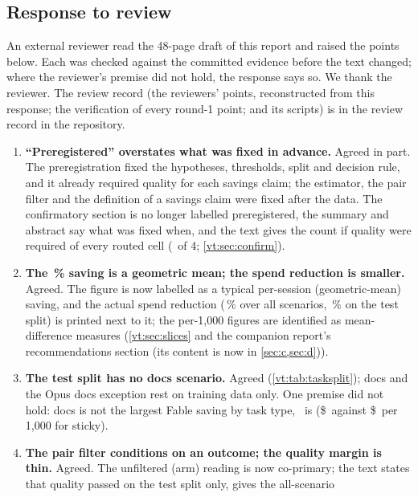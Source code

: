 \subsection{Response to review}\label{vt:app:review}

An external reviewer read the 48-page draft of this report and raised the points below. Each was checked against
the committed evidence before the text changed; where the reviewer's premise did not hold, the response says so.
We thank the reviewer. The review record (the reviewers' points, reconstructed from this response; the verification of
every round-1 point; and its scripts) is in the review record in the repository.

\begin{enumerate}[leftmargin=1.6em]
  \item \textbf{``Preregistered'' overstates what was fixed in advance.} Agreed in part. The preregistration fixed the
    hypotheses, thresholds, split and decision rule, and it already required quality for each savings claim; the
    estimator, the pair filter and the definition of a savings claim were fixed after the data. The confirmatory
    section is no longer labelled preregistered, the summary and abstract say what was fixed when, and the text
    gives the count if quality were required of every routed cell (\RvNHypAllQuality\ of 4; \cref{vt:sec:confirm}).
  \item \textbf{The \CfFableStickySaving\,\% saving is a geometric mean; the spend reduction is smaller.} Agreed. The
    figure is now labelled as a typical per-session (geometric-mean) saving, and the actual spend reduction
    (\RvSpendCutAll\,\% over all scenarios, \RvSpendCutTest\,\% on the test split) is printed next to it; the per-1,000
    figures are identified as mean-difference measures (\cref{vt:sec:slices} and the companion report's recommendations section (its content is now in \cref{sec:c,sec:d})).
  \item \textbf{The test split has no docs scenario.} Agreed (\cref{vt:tab:tasksplit}); docs and the Opus docs exception
    rest on training data only. One premise did not hold: docs is not the largest Fable saving by task type,
    \RvBestTaskFableSticky\ is (\$\RvSavReviewFableSticky\ against \$\RvSavDocsFableSticky\ per 1,000 for sticky).
  \item \textbf{The pair filter conditions on an outcome; the quality margin is thin.} Agreed. The unfiltered (arm)
    reading is now co-primary; the text states that quality passed on the test split only, gives the all-scenario

\end{enumerate}
